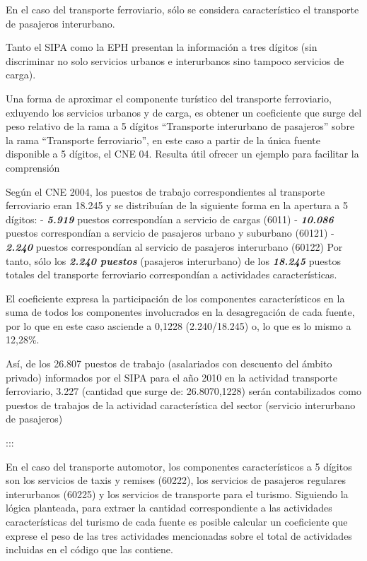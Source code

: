 \documentclass[
  openany]{book}
\begin{document}
En el caso del transporte ferroviario, sólo se considera característico el transporte de pasajeros interurbano.

Tanto el SIPA como la EPH presentan la información a tres dígitos (sin discriminar no solo servicios urbanos e interurbanos sino tampoco servicios de carga).

Una forma de aproximar el componente turístico del transporte ferroviario, exluyendo los servicios urbanos y de carga, es obtener un coeficiente que surge del peso relativo de la rama a 5 dígitos ``Transporte interurbano de pasajeros'' sobre la rama ``Transporte ferroviario'', en este caso a partir de la única fuente disponible a 5 dígitos, el CNE 04.
Resulta útil ofrecer un ejemplo para facilitar la comprensión

Según el CNE 2004, los puestos de trabajo correspondientes al transporte ferroviario eran 18.245 y se distribuían de la siguiente forma en la apertura a 5 dígitos: - \textbf{\emph{5.919}} puestos correspondían a servicio de cargas (6011) - \textbf{\emph{10.086}} puestos correspondían a servicio de pasajeros urbano y suburbano (60121) - \textbf{\emph{2.240}} puestos correspondían al servicio de pasajeros interurbano (60122) Por tanto, sólo los \textbf{\emph{2.240 puestos}} (pasajeros interurbano) de los \textbf{\emph{18.245}} puestos totales del transporte ferroviario correspondían a actividades características.

El coeficiente expresa la participación de los componentes característicos en la suma de todos los componentes involucrados en la desagregación de cada fuente, por lo que en este caso asciende a 0,1228 (2.240/18.245) o, lo que es lo mismo a 12,28\%.

Así, de los 26.807 puestos de trabajo (asalariados con descuento del ámbito privado) informados por el SIPA para el año 2010 en la actividad transporte ferroviario, 3.227 (cantidad que surge de: 26.8070,1228) serán contabilizados como puestos de trabajos de la actividad característica del sector (servicio interurbano de pasajeros)

:::

En el caso del transporte automotor, los componentes característicos a 5 dígitos son los servicios de taxis y remises (60222), los servicios de pasajeros regulares interurbanos (60225) y los servicios de transporte para el turismo. Siguiendo la lógica planteada, para extraer la cantidad correspondiente a las actividades características del turismo de cada fuente es posible calcular un coeficiente que exprese el peso de las tres actividades mencionadas sobre el total de actividades incluidas en el código que las contiene.
\end{document}
